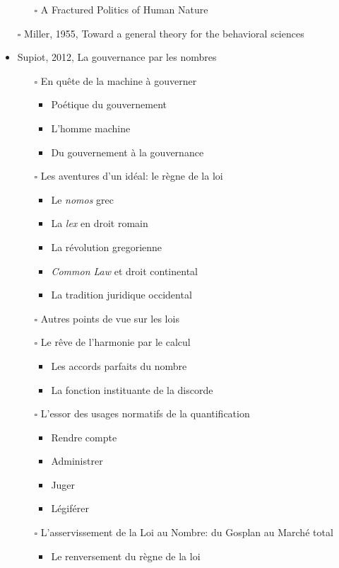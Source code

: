 \documentclass[paper=B6,portrait,twoside=true,twocolumn=false,headinclude=true,footinclude=false,fontsize=12,BCOR=10mm,DIV=calc,pagesize=auto,titlepage=firstiscover,mpinclude=false,headings=normal,headings=twolinechapter,open=right,toc=graduated,chapterprefix=false,numbers=endperiod,parskip=half+]{scrbook}
\theoremstyle{definition}
\begin{document}
\begin{itemize}
\begin{itemize}
\item[{$\square$}] A Fractured Politics of Human Nature
\end{itemize}
\item[{$\square$}] Miller, 1955, Toward a general theory for the behavioral sciences
\item\relax [0/15] Supiot, 2012, La gouvernance par les nombres
\begin{itemize}
\item[{$\square$}] En quête de la machine à gouverner
\begin{itemize}
\item Poétique du gouvernement
\item L'homme machine
\item Du gouvernement à la gouvernance
\end{itemize}
\item[{$\square$}] Les aventures d'un idéal: le règne de la loi
\begin{itemize}
\item Le \emph{nomos} grec
\item La \emph{lex} en droit romain
\item La révolution gregorienne
\item \emph{Common Law} et droit continental
\item La tradition juridique occidental
\end{itemize}
\item[{$\square$}] Autres points de vue sur les lois
\item[{$\square$}] Le rêve de l'harmonie par le calcul
\begin{itemize}
\item Les accords parfaits du nombre
\item La fonction instituante de la discorde
\end{itemize}
\item[{$\square$}] L'essor des usages normatifs de la quantification
\begin{itemize}
\item Rendre compte
\item Administrer
\item Juger
\item Légiférer
\end{itemize}
\item[{$\square$}] L’asservissement de la Loi au Nombre: du Gosplan au Marché total
\begin{itemize}
\item Le renversement du règne de la loi

\end{itemize}
\end{itemize}
\end{itemize}
\end{document}
